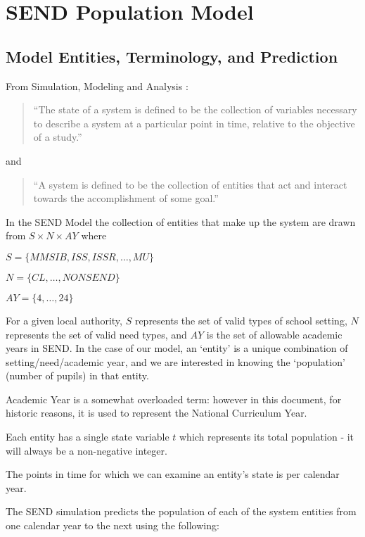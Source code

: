 \documentclass[margin=5mm]{article}
\begin{document}
\section{SEND Population Model}

\subsection{Model Entities, Terminology, and Prediction}\label{summary}
From Simulation, Modeling and Analysis \cite[ch.~1,p.~3]{sma4}:

\begin{quote}
``The state of a system is defined to be the collection of variables
necessary to describe a system at a particular point in time, relative
to the objective of a study.''
\end{quote}

and

\begin{quote}
``A system is defined to be the collection of entities that act and
interact towards the accomplishment of some goal.''
\end{quote}

In the SEND Model the collection of entities that make up the system
are drawn from $S \times N \times AY$ where

$S = \{MMSIB, ISS, ISSR, \dots, MU\}$

$N = \{CL, \dots, NONSEND\}$

$AY = \{4, \dots, 24\}$

For a given local authority, $S$ represents the set of valid types of
school setting, $N$ represents the set of valid need types, and $AY$
is the set of allowable academic years in SEND.  In the case of our
model, an `entity' is a unique combination of setting/need/academic
year, and we are interested in knowing the `population' (number of
pupils) in that entity.

Academic Year is a somewhat overloaded term: however in this document,
for historic reasons, it is used to represent the National Curriculum
Year.

Each entity has a single state variable $t$ which represents
its total population - it will always be a non-negative integer.

The points in time for which we can examine an entity's state is per
calendar year.

The SEND simulation predicts the population of each of the system
entities from one calendar year to the next using the following:
\end{document}
